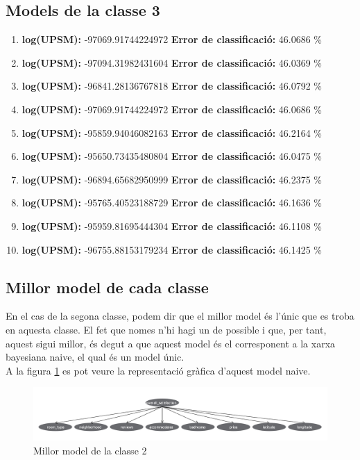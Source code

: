 \subsection{Models de la classe 3}
\begin{enumerate}
	\item \textbf{log(UPSM):} -97069.91744224972 \textbf{Error de classificació:} 46.0686 \%
	\item \textbf{log(UPSM):} -97094.31982431604 \textbf{Error de classificació:} 46.0369 \%
	\item \textbf{log(UPSM):} -96841.28136767818 \textbf{Error de classificació:} 46.0792 \%
	\item \textbf{log(UPSM):} -97069.91744224972 \textbf{Error de classificació:} 46.0686 \%
	\item \textbf{log(UPSM):} -95859.94046082163 \textbf{Error de classificació:} 46.2164 \%
	\item \textbf{log(UPSM):} -95650.73435480804 \textbf{Error de classificació:} 46.0475 \%
	\item \textbf{log(UPSM):} -96894.65682950999 \textbf{Error de classificació:} 46.2375 \%
	\item \textbf{log(UPSM):} -95765.40523188729 \textbf{Error de classificació:} 46.1636 \%
	\item \textbf{log(UPSM):} -95959.81695444304 \textbf{Error de classificació:} 46.1108 \%
	\item \textbf{log(UPSM):} -96755.88153179234 \textbf{Error de classificació:} 46.1425 \%
\end{enumerate}

\subsection{Millor model de cada classe}
En el cas de la segona classe, podem dir que el millor model és l'únic que es troba en aquesta classe. El fet que nomes n'hi hagi un de possible i que, per tant, aquest sigui millor, és degut a que aquest model és el corresponent a la xarxa bayesiana naive, el qual és un model únic.\\
A la figura \ref{fig:model2} es pot veure la representació gràfica d'aquest model naive.
\begin{figure}[H]
	\centering
	\includegraphics[width=15cm]{imgs/model2.png}
	\caption{Millor model de la classe 2}
	\label{fig:model2}
\end{figure}	


